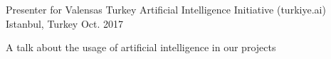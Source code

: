 

\begin{cventries}

  \cventry
    {Presenter for Valensas}
    {Turkey Artificial Intelligence Initiative (turkiye.ai)}
    {Istanbul, Turkey}
    {Oct. 2017}
    {
      \begin{cvitems}
        \item {A talk about the usage of artificial intelligence in our projects}
      \end{cvitems}
    }
    
\end{cventries}
